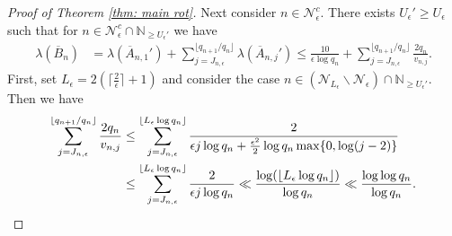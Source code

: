 \documentclass[11pt]{amsart}
\theoremstyle{definition}
\numberwithin{equation}{section}
\begin{document}
\begin{proof}[Proof of Theorem \ref{thm: main rot}]
Next consider $n\in\mathcal{N}_{\epsilon}^c$.
There exists $U_\epsilon'\geq U_{\epsilon}$ such that for $n\in \mathcal{N}_{\epsilon}^c\cap\mathbb{N}_{\geq U_{\epsilon}'}$ we have
\begin{align}
 \lambda(\overline{B}_n)
 &=\lambda(\overline{A}_{n,1}')+\sum_{j=J_{n,\epsilon}}^{\lfloor q_{n+1}/q_n\rfloor} \lambda(\overline{A}_{n,j}')
 \leq \frac{10}{\epsilon \log q_n}+  \sum_{j=J_{n,\epsilon}}^{\lfloor q_{n+1}/q_n\rfloor} \frac{2q_n}{v_{n,j}}.\label{eq: lambda upper B}
\end{align}
First, set $L_{\epsilon}=2\left(\lceil \frac{2}{\epsilon}\rceil +1\right)$ 
and consider the case $n\in (\mathcal{N}_{L_{\epsilon}}\backslash \mathcal{N}_{\epsilon})\cap\mathbb{N}_{\geq U_{\epsilon}'}$. 
Then we have 
\begin{align}
 \sum_{j=J_{n,\epsilon}}^{\lfloor q_{n+1}/q_n\rfloor} \frac{2q_n}{v_{n,j}}
 &\leq \sum_{j=J_{n,\epsilon}}^{\lfloor L_{\epsilon} \log q_n\rfloor}
 \frac{2}{\epsilon j \log q_n+\frac{\epsilon^2}{2} \log q_n \max\{0,\log(j-2)\}}\notag\\
 &\leq \sum_{j=J_{n,\epsilon}}^{\lfloor L_{\epsilon} \log q_n\rfloor}
 \frac{2}{\epsilon j \log q_n}
 \ll \frac{\log (\lfloor L_{\epsilon} \log q_n\rfloor)}{\log q_n}
 \ll \frac{\log\log q_n}{\log q_n}.\label{eq: lambda upper B b}
\end{align}




\end{proof}
\end{document}
